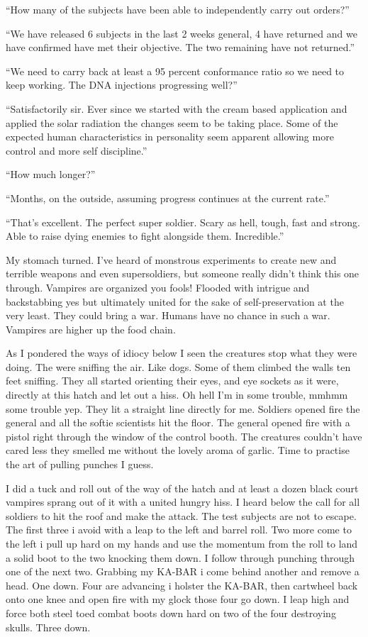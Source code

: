 ``How many of the subjects have been able to independently carry out orders?''

``We have released 6 subjects in the last 2 weeks general, 4 have returned and we have confirmed have met their objective. The two remaining have not returned.''

``We need to carry back at least a 95 percent conformance ratio so we need to keep working. The DNA injections progressing well?''

``Satisfactorily sir. Ever since we started with the cream based application and applied the solar radiation the changes seem to be taking place. Some of the expected human characteristics in personality seem apparent allowing more control and more self discipline.''

``How much longer?''

``Months, on the outside, assuming progress continues at the current rate.''

``That's excellent. The perfect super soldier. Scary as hell, tough, fast and strong. Able to raise dying enemies to fight alongside them. Incredible.''

My stomach turned. I've heard of monstrous experiments to create new and terrible weapons and even supersoldiers, but someone really didn't think this one through. Vampires are organized you fools! Flooded with intrigue and backstabbing yes but ultimately united for the sake of self-preservation at the very least. They could bring a war. Humans have no chance in such a war. Vampires are higher up the food chain.

As I pondered the ways of idiocy below I seen the creatures stop what they were doing. The were sniffing the air. Like dogs. Some of them climbed the walls ten feet sniffing. They all started orienting their eyes, and eye sockets as it were, directly at this hatch and let out a hiss. Oh hell I'm in some trouble, mmhmm some trouble yep. They lit a straight line directly for me. Soldiers opened fire the general and all the softie scientists hit the floor. The general opened fire with a pistol right through the window of the control booth. The creatures couldn't have cared less they smelled me without the lovely aroma of garlic. Time to practise the art of pulling punches I guess.

I did a tuck and roll out of the way of the hatch and at least a dozen black court vampires sprang out of it with a united hungry hiss. I heard below the call for all soldiers to hit the roof and make the attack. The test subjects are not to escape. The first three i avoid with a leap to the left and barrel roll. Two more come to the left i pull up hard on my hands and use the momentum from the roll to land a solid boot to the two knocking them down. I follow through punching through one of the next two. Grabbing my KA-BAR i come behind another and remove a head. One down. Four are advancing i holster the KA-BAR, then cartwheel back onto one knee and open fire with my glock those four go down. I leap high and force both steel toed combat boots down hard on two of the four destroying skulls. Three down.

